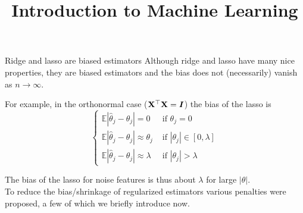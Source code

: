 \documentclass[11pt,compress,t,notes=noshow, xcolor=table]{beamer}
\title{Introduction to Machine Learning}
\date{}
\begin{document}

\begin{vbframe}{Ridge and lasso are biased estimators} 
Although ridge and lasso have many nice properties, they are biased estimators and the bias does not (necessarily) vanish as $n \rightarrow \infty$.\\
\vspace{0.3cm}

For example, in the orthonormal case ($\mathbf{X}^{\top}\mathbf{X}=\bm{I}$) the bias of the lasso is
$$
\begin{cases}\mathbb{E}\left|\widehat{\theta}_j-\theta_j\right|=0 & \text { if } \theta_j=0 \\ \mathbb{E}\left|\widehat{\theta}_j-\theta_j\right| \approx \theta_j & \text { if }\left|\theta_j\right| \in[0, \lambda] \\ \mathbb{E}\left|\widehat{\theta}_j-\theta_j\right| \approx \lambda & \text { if }\left|\theta_j\right|>\lambda\end{cases}
$$
\vspace{0.3cm}

The bias of the lasso for noise features is thus about $\lambda$ for large $|\theta|$.\\
\vspace{0.2cm}
To reduce the bias/shrinkage of regularized estimators various penalties were proposed, a few of which we briefly introduce now.

\end{vbframe}
\end{document}

